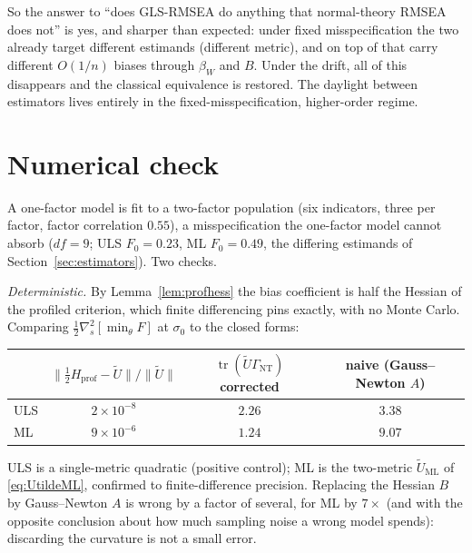 \documentclass[11pt]{article}
\newcommand{\tr}{\operatorname{tr}}
\theoremstyle{plain}
\theoremstyle{remark}
\begin{document}
So the answer to ``does GLS-RMSEA do anything that normal-theory RMSEA does
not'' is yes, and sharper than expected: under fixed misspecification the two
already target different estimands (different metric), and on top of that carry
different $O(1/n)$ biases through $\beta_W$ and $B$. Under the drift, all of this
disappears and the classical equivalence is restored. The daylight between
estimators lives entirely in the fixed-misspecification, higher-order regime.

\section{Numerical check}\label{sec:check}

A one-factor model is fit to a two-factor population (six indicators, three per
factor, factor correlation $0.55$), a misspecification the one-factor model
cannot absorb ($df=9$; ULS $F_0=0.23$, ML $F_0=0.49$, the differing estimands of
Section~\ref{sec:estimators}). Two checks.

\emph{Deterministic.} By Lemma~\ref{lem:profhess} the bias coefficient is half
the Hessian of the profiled criterion, which finite differencing pins exactly,
with no Monte Carlo. Comparing $\tfrac12\nabla_s^2[\min_\theta F]$ at $\sigma_0$
to the closed forms:
\begin{center}
\begin{tabular}{lccc}
 & $\|\tfrac12 H_{\mathrm{prof}}-\tilde U\|/\|\tilde U\|$ & $\tr(\tilde U\Gamma_{\mathrm{NT}})$ corrected & naive (Gauss--Newton $A$)\\
\hline
ULS & $2\times10^{-8}$ & $2.26$ & $3.38$\\
ML  & $9\times10^{-6}$ & $1.24$ & $9.07$\\
\end{tabular}
\end{center}
ULS is a single-metric quadratic (positive control); ML is the two-metric
$\tilde U_{\mathrm{ML}}$ of \eqref{eq:UtildeML}, confirmed to finite-difference
precision. Replacing the Hessian $B$ by Gauss--Newton $A$ is wrong by a factor of
several, for ML by $7\times$ (and with the opposite conclusion about how much
sampling noise a wrong model spends): discarding the curvature is not a small
error.
\end{document}
